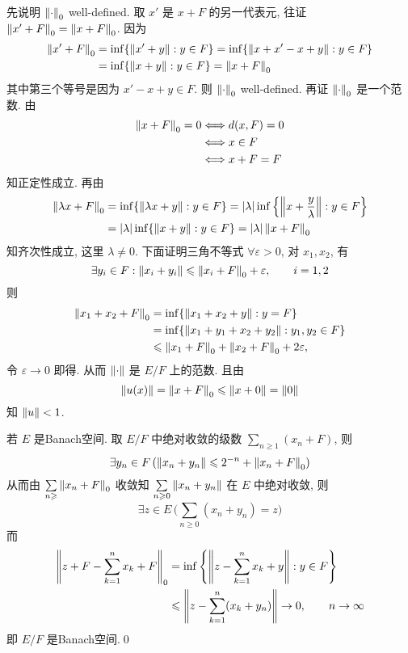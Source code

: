 	\begin{Proof}
		先说明 $ \left\| \cdot \right\|_{0} $ well-defined. 取 $ x' $ 是 $ x+F $ 的另一代表元, 往证 $ \left\| x'+F \right\|_{0}=\left\| x+F \right\|_{0} $. 因为
		\[
			\begin{aligned}
				\left\| x'+F \right\|_{0} & =\inf\{ \left\| x'+y \right\|:y\in F \}  = \inf\{ \left\| x+x'-x+y \right\|: y\in F \} \\
				 & =\inf\{ \left\| x+y \right\|: y\in F \}=\left\| x+F \right\|_{0}
			\end{aligned}
		\]
		其中第三个等号是因为 $ x'-x+y\in F $. 则 $ \left\| \cdot \right\|_{0} $ well-defined. 再证 $ \left\| \cdot \right\|_{0} $ 是一个范数. 由
		\[
			\begin{aligned}
				\left\| x+F \right\|_{0}=0 & \Longleftrightarrow d(x, F)=0\\
				&  \Longleftrightarrow x\in F\\
				& \Longleftrightarrow x+F=F
			\end{aligned}
		\]
		知正定性成立. 再由
		\[
			\begin{aligned}
				\left\| \lambda x+F \right\|_{0} & =\inf\{ \left\| \lambda x+y \right\|: y\in F \}=\left| \lambda \right| \inf\left\{ \left\| x+\frac{y}{\lambda} \right\|: y\in F \right\}\\
				& =\left| \lambda \right| \inf\{ \left\| x+y \right\|: y\in F \}=\left| \lambda \right| \left\| x+F \right\|_{0}
			\end{aligned}
		\]
		知齐次性成立, 这里 $ \lambda\neq0 $. 下面证明三角不等式 $ \forall\varepsilon>0 $, 对 $ x_{1}, x_{2} $, 有
		\[
			\exists y_{i}\in F : \left\| x_{i}+y_{i} \right\|\leqslant\left\| x_{i}+F \right\|_{0}+\varepsilon, \qquad i=1, 2
		\]
		则
		\[
			\begin{aligned}
				\left\| x_{1}+x_{2}+F \right\|_{0} & =\inf\{ \left\| x_{1}+x_{2}+y \right\|: y=F \}\\
				& =\inf\{ \left\| x_{1}+y_{1}+x_{2}+y_{2} \right\|: y_{1}, y_{2}\in F \}\\
				& \leqslant \left\| x_{1}+F \right\|_{0}+\left\| x_{2}+F \right\|_{0}+2\varepsilon,
			\end{aligned}
		\]
		令 $ \varepsilon\to 0 $ 即得. 从而 $ \left\| \cdot \right\| $ 是 $ E/F $ 上的范数. 且由
		\[
			 \left\| u(x) \right\|=\left\| x+F \right\|_{0}\leqslant \left\| x+0 \right\|=\left\| 0 \right\|
		\]
		知 $ \left\| u \right\|<1 $.

		若 $ E $ 是Banach空间. 取 $ E/F $ 中绝对收敛的级数 $ \sum\limits_{n\geqslant1}(x_{n}+F) $, 则
		\[
			\exists y_{n}\in F\,(\left\| x_{n}+y_{n} \right\|\leqslant 2^{-n}+\left\| x_{n}+F \right\|_{0})
		\]
		从而由 $ \sum\limits_{n\geqslant}\left\| x_{n}+F \right\|_{0} $ 收敛知 $ \sum\limits_{n\geqslant0}\left\| x_{n}+y_{n} \right\| $ 在 $ E $ 中绝对收敛, 则
		\[
			\exists z\in E\,\bigg( \sum_{n\geqslant0}(x_{n}+y_{n})=z \bigg)
		\]
		而 
		\[
			\begin{aligned}
				\left\| z+F-\sum_{k=1}^{n}x_{k}+F \right\|_{0} & =\inf\left\{ \left\| z-\sum_{k=1}^{n}x_{k}+y \right\|:y\in F \right\}\\
				& \leqslant \left\| z-\sum_{k=1}^{n}(x_{k}+y_{n}) \right\|\to 0,\qquad n\to\infty
			\end{aligned}
		\]
		即 $ E/F $ 是Banach空间.\qed
	\end{Proof}